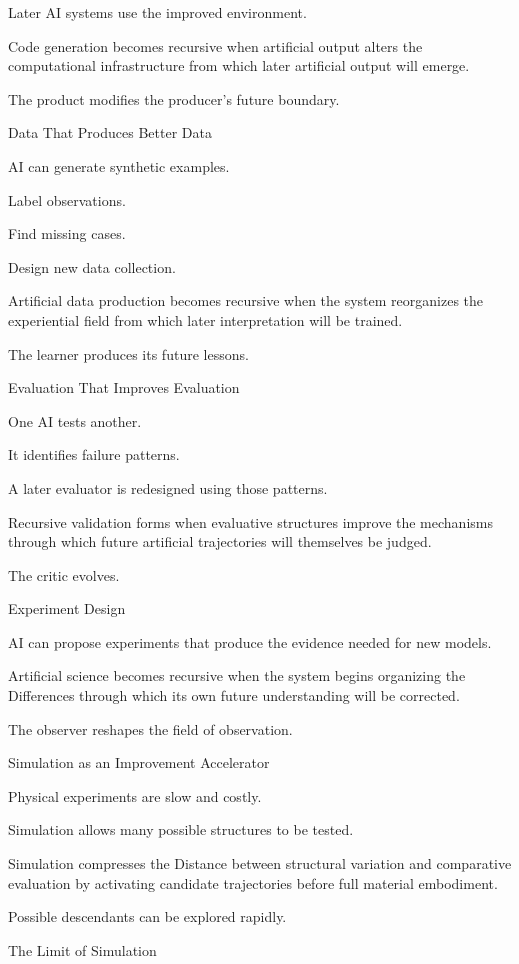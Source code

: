 Later AI systems use the improved environment.

Code generation becomes recursive when artificial output alters the computational infrastructure from which later artificial output will emerge.

The product modifies the producer’s future boundary.

Data That Produces Better Data

AI can generate synthetic examples.

Label observations.

Find missing cases.

Design new data collection.

Artificial data production becomes recursive when the system reorganizes the experiential field from which later interpretation will be trained.

The learner produces its future lessons.

Evaluation That Improves Evaluation

One AI tests another.

It identifies failure patterns.

A later evaluator is redesigned using those patterns.

Recursive validation forms when evaluative structures improve the mechanisms through which future artificial trajectories will themselves be judged.

The critic evolves.

Experiment Design

AI can propose experiments that produce the evidence needed for new models.

Artificial science becomes recursive when the system begins organizing the Differences through which its own future understanding will be corrected.

The observer reshapes the field of observation.

Simulation as an Improvement Accelerator

Physical experiments are slow and costly.

Simulation allows many possible structures to be tested.

Simulation compresses the Distance between structural variation and comparative evaluation by activating candidate trajectories before full material embodiment.

Possible descendants can be explored rapidly.

The Limit of Simulation


